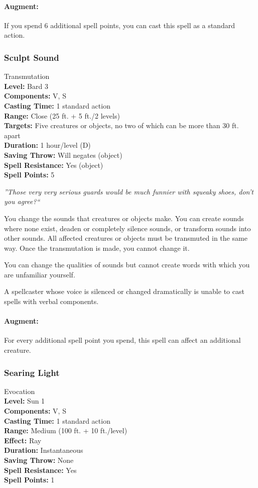 \paragraph{Augment:} If you spend 6 additional spell points, you can cast this spell as a standard action.

\subsubsection{Sculpt Sound}
\label{Spell:SculptSound}
Transmutation
\\ \textbf{Level:} Bard 3
\\ \textbf{Components:} V, S
\\ \textbf{Casting Time:} 1 standard action
\\ \textbf{Range:} Close (25 ft. + 5 ft./2 levels)
\\ \textbf{Targets:} Five creatures or objects, no two of which can be more than 30 ft. apart
\\ \textbf{Duration:} 1 hour/level (D)
\\ \textbf{Saving Throw:} Will negates (object)
\\ \textbf{Spell Resistance:} Yes (object)
\\ \textbf{Spell Points:} 5

\emph{''Those very very serious guards would be much funnier with squeaky shoes, don't you agree?``}

You change the sounds that creatures or objects make. You can create sounds where none exist, deaden or completely silence sounds, or transform sounds into other sounds. All affected creatures or objects must be transmuted in the same way. Once the transmutation is made, you cannot change it.

You can change the qualities of sounds but cannot create words with which you are unfamiliar yourself.

A spellcaster whose voice is silenced or changed dramatically is unable to cast spells with verbal components.

\paragraph{Augment:} For every additional spell point you spend, this spell can affect an additional creature.

\subsubsection{Searing Light}
\label{Spell:SearingLight}
Evocation
\\ \textbf{Level:} Sun 1
\\ \textbf{Components:} V, S
\\ \textbf{Casting Time:} 1 standard action
\\ \textbf{Range:} Medium (100 ft. + 10 ft./level)
\\ \textbf{Effect:} Ray
\\ \textbf{Duration:} Instantaneous
\\ \textbf{Saving Throw:} None
\\ \textbf{Spell Resistance:} Yes
\\ \textbf{Spell Points:} 1


